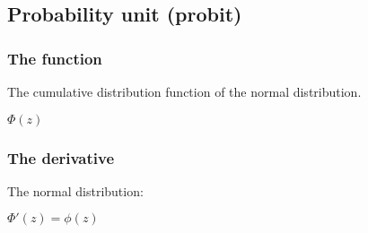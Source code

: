
\subsection{Probability unit (probit)}

\subsubsection{The function}

The cumulative distribution function of the normal distribution.

\(\Phi (z)\)

\subsubsection{The derivative}

The normal distribution:

\(\Phi'(z)=\phi (z)\)


